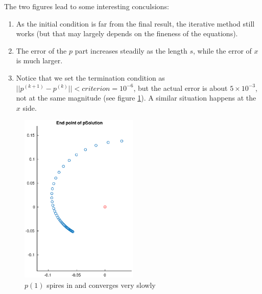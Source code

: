 \documentclass[a4paper]{article}
\begin{document}
The two figures lead to some interesting conculsions:
\begin{enumerate}
	\item As the initial condition is far from the final result, the iterative method still works (but that may largely depends on the fineness of the equations).
	\item The error of the $p$ part increases steadily as the length $s$, while the error of $x$ is much larger.
	\item Notice that we set the termination condition as $||p^{(k+1)} - p^{(k)}|| < criterion = 10^{-6}$, but the actual error is about $5 \times 10^{-3}$, not at the same magnitude (see figure \ref{fig:p3-demo-pEnd}). A similar situation happens at the $x$ side.
\end{enumerate}
\begin{figure}[h]
	\centering
	\includegraphics[width=0.5\textwidth]{part3-demo-pEnd}
	\caption{$p(1)$ spires in and converges very slowly}
	\label{fig:p3-demo-pEnd}
\end{figure}
\end{document}
